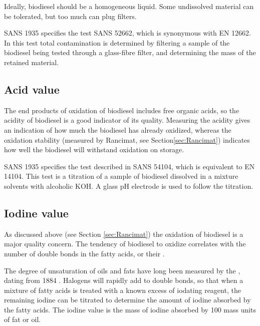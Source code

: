 Ideally, biodiesel should be a homogeneous liquid. Some undissolved material can
be tolerated, but too much can plug filters.

SANS 1935 specifies the test SANS 52662, which is synonymous with EN 12662. In
this test total contamination is determined by filtering a sample of the
biodiesel being tested through a glass-fibre filter, and determining the mass of the
retained material.

\subsection{Acid value}

The end products of oxidation of biodiesel includes free organic acids, so the
acidity of biodiesel is a good indicator of its quality. Measuring the acidity
gives an indication of how much the biodiesel has already oxidized, whereas the
oxidation stability (measured by Rancimat, see Section\ref{sec:Rancimat})
indicates how well the biodiesel will withstand oxidation on storage.

SANS 1935 specifies the test described in SANS 54104, which is equivalent to EN
14104. This test is a titration of a sample of biodiesel dissolved in a
mixture solvents with alcoholic KOH. A glass pH electrode is used to follow the
titration.

\subsection{Iodine value}

As discussed above (see Section \ref{sec:Rancimat}) the oxidation of biodiesel
is a major quality concern. The tendency of biodiesel to oxidize correlates with
the number of double bonds in the fatty acids, or their .


The degree of unsaturation of oils and fats have long been measured by the
, dating from 1884 \autocite{Knothe2007}. Halogens will
rapidly add to double bonds, so that when a mixture of fatty acids is treated
with a known excess of iodating reagent, the remaining iodine can be titrated to
determine the amount of iodine absorbed by the fatty acids. The iodine value is
the mass of iodine absorbed by 100 mass units of fat or oil.

